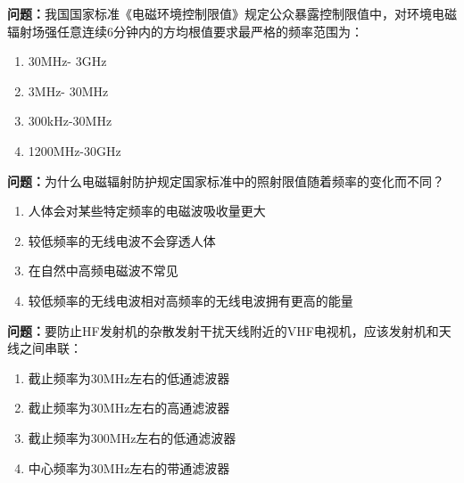 %


\noindent\textbf{问题：}我国国家标准《电磁环境控制限值》规定公众暴露控制限值中，对环境电磁辐射场强任意连续6分钟内的方均根值要求最严格的频率范围为： 
\begin{enumerate}[label=\Alph*), leftmargin=3em]
\item 30MHz- 3GHz
\item 3MHz- 30MHz
\item 300kHz-30MHz
\item 1200MHz-30GHz
\end{enumerate}

\bigskip


\noindent\textbf{问题：}为什么电磁辐射防护规定国家标准中的照射限值随着频率的变化而不同？
\begin{enumerate}[label=\Alph*), leftmargin=3em]
\item 人体会对某些特定频率的电磁波吸收量更大
\item 较低频率的无线电波不会穿透人体
\item 在自然中高频电磁波不常见
\item 较低频率的无线电波相对高频率的无线电波拥有更高的能量
\end{enumerate}

\bigskip


\noindent\textbf{问题：}要防止HF发射机的杂散发射干扰天线附近的VHF电视机，应该发射机和天线之间串联：
\begin{enumerate}[label=\Alph*), leftmargin=3em]
\item 截止频率为30MHz左右的低通滤波器
\item 截止频率为30MHz左右的高通滤波器
\item 截止频率为300MHz左右的低通滤波器
\item 中心频率为30MHz左右的带通滤波器
\end{enumerate}


